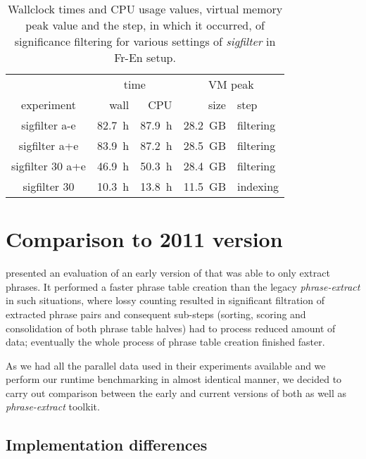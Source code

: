 \begin{table}[ht]
\centering
\begin{tabular}{ | c | r r | r l | }
\hline
 & \multicolumn{2}{|c|}{time} & \multicolumn{2}{|c|}{VM peak} \\
experiment & wall & CPU & size & step \\
\hline
\hline
sigfilter a-e     & 82.7~h & 87.9~h & 28.2~GB & filtering \\
sigfilter a+e     & 83.9~h & 87.2~h & 28.5~GB & filtering \\
sigfilter 30 a+e  & 46.9~h & 50.3~h & 28.4~GB & filtering \\
sigfilter 30      & 10.3~h & 13.8~h & 11.5~GB & indexing \\
\hline
\end{tabular}
\caption{\label{fr-en-sigfilter-runtime-benchmarks}
Wallclock times and CPU usage values, virtual memory peak value and the step,
in which it occurred, of significance filtering for various settings of \emph{sigfilter} in Fr-En setup.}
\end{table}

\section{Comparison to 2011 version}
\label{sec:cu-bojar-results}

\citet{przywara:eppex} presented an evaluation of an early version of \eppex{}
that was able to only extract phrases. It performed a faster phrase
table creation than the legacy \emph{phrase-extract} in such situations,
where lossy counting resulted in significant filtration of extracted phrase
pairs and consequent sub-steps (sorting, scoring and consolidation of both
phrase table halves) had to process reduced amount of data;
eventually the whole process of phrase table creation finished faster.

As we had all the parallel data used in their experiments available and
we perform our runtime benchmarking in almost identical manner,
we decided to carry out comparison between the early and current versions of
both \eppex{} as well as \emph{phrase-extract} toolkit.

\subsection{Implementation differences}


